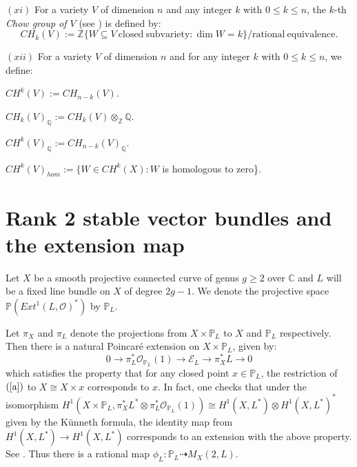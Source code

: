 \documentclass[12pt, reqno]{amsart}
\newcommand{\closed}{\textrm{closed}}
\newcommand{\subvariety}{\textrm{subvariety}}
\newcommand{\rational}{\textrm{rational}}
\newcommand{\equivalence}{\textrm{equivalence}}
\begin{document}
$(xi)$  For a variety $V$ of dimension $n$ and any integer $k$ with $0\leq k\leq n$, the $k$-th {\it Chow group of $V$} (see \cite{f}) is defined by:
\[CH_{k}(V):=\mathbb{Z}\{W\subseteq V~ \closed ~\subvariety : \dim W=k\}/ \rational ~\equivalence.\]

\vspace{0.5em}
$(xii)$ For a variety $V$ of dimension $n$ and for any integer $k$ with $0\leq k\leq n$, we define: 

$CH^{k}(V):=CH_{n-k}(V)$.

$CH_{k}(V)_{\mathbb{Q}}:=CH_{k}(V)\otimes_{\mathbb{Z}} \mathbb{Q}$.

$CH^{k}(V)_{\mathbb{Q}}:=CH_{n-k}(V)_{\mathbb{Q}}$.

$CH^{k}(V)_{hom}:=\{W\in CH^{k}(X): W$ is homologous to zero\}.

\section{Rank 2 stable vector bundles and the extension map}

Let $X$ be a smooth projective connected curve of genus $g\geq 2$ over $\mathbb{C}$ and $L$ will be a fixed line bundle on $X$ of degree $2g-1$. We  denote the projective space $\mathbb{P}(Ext^{1}(L,\mathcal{O})^{*})$ by $\mathbb{P}_{L}$. %

Let $\pi_{X}$ and $\pi_{L}$ denote the projections from $X\times \mathbb{P}_{L}$ to $X$ and $\mathbb{P}_{L}$ respectively. Then there is a natural Poincar\'e extension on $X\times \mathbb{P}_{L}$, given by:
\begin{equation}\label{a}
    0\rightarrow \pi_{L}^{*}\mathcal{O}_{\mathbb{P}_{L}}(1)\rightarrow \mathcal{E}_{L}\rightarrow \pi_{X}^{*}L\rightarrow 0
    \end{equation}
    which satisfies the property that for any closed point $x\in \mathbb{P}_{L}$, the restriction of $(\ref{a})$ to $X\cong X\times x$ corresponds to $x$. In fact, one checks that under the isomorphism $H^{1}(X\times \mathbb{P}_{L}, \pi_{X}^{*}L^{*}\otimes \pi_{L}^{*}\mathcal{O}_{\mathbb{P}_{L}}(1))\cong H^{1}(X,L^{*})\otimes H^{1}(X,L^{*})^{*}$ given by the K\"unneth formula, the identity map from $H^{1}(X,L^{*})\rightarrow H^{1}(X,L^{*})$ corresponds to an extension with the above property. See \cite[Definition-claim 3.1]{b}. Thus there is a rational map $\phi_{L}:\mathbb{P}_{L}\dashrightarrow M_{X}(2,L)$.
\end{document}
